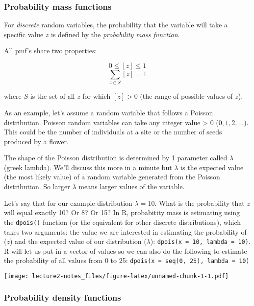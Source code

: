\documentclass[]{article}
\begin{document}
\hypertarget{probability-mass-functions}{%
\subsubsection{Probability mass
functions}\label{probability-mass-functions}}

For \emph{discrete} random variables, the probability that the variable
will take a specific value \(z\) is defined by the \emph{probability
mass function}.

All pmf's share two properties:

\[0 \leq [z] \leq 1\] \[\sum_{z \in S}[z]=1\]

where \(S\) is the set of all \(z\) for which \([z] > 0\) (the range of
possible values of \(z\)).

As an example, let's assume a random variable that follows a Poisson
distribution. Poisson random variables can take any integer value
\textgreater{} 0 (\(0, 1, 2,...\)). This could be the number of
individuals at a site or the number of seeds produced by a flower.

The shape of the Poisson distribution is determined by 1 parameter
called \(\lambda\) (greek lambda). We'll discuss this more in a minute
but \(\lambda\) is the expected value (the most likely value) of a
random variable generated from the Poisson distribution. So larger
\(\lambda\) means larger values of the variable.

Let's say that for our example distribution \(\lambda = 10\). What is
the probability that \(z\) will equal exactly 10? Or 8? Or 15? In R,
probabitity mass is estimating using the \texttt{dpois()} function (or
the equivalent for other discrete distributions), which takes two
arguments: the value we are interested in estimating the probability of
(\(z\)) and the expected value of our distribution (\(\lambda\)):
\texttt{dpois(x\ =\ 10,\ lambda\ =\ 10)}. R will let us put in a vector
of values so we can also do the following to estimate the probability of
all values from 0 to 25:
\texttt{dpois(x\ =\ seq(0,\ 25),\ lambda\ =\ 10)}

\texttt{[image: lecture2-notes\_files/figure-latex/unnamed-chunk-1-1.pdf]}

\hypertarget{probability-density-functions}{%
\subsubsection{Probability density
functions}\label{probability-density-functions}}
\end{document}

